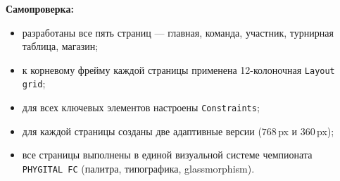 \textbf{Самопроверка:}
\begin{itemize}
  \item разработаны все пять страниц --- главная, команда, участник,
        турнирная таблица, магазин;
  \item к корневому фрейму каждой страницы применена
        12-колоночная \texttt{Layout grid};
  \item для всех ключевых элементов настроены \texttt{Constraints};
  \item для каждой страницы созданы две адаптивные версии
        (\(768\,\)px и \(360\,\)px);
  \item все страницы выполнены в единой визуальной системе
        чемпионата \texttt{PHYGITAL~FC} (палитра, типографика,
        glassmorphism).
\end{itemize}

\endinput
